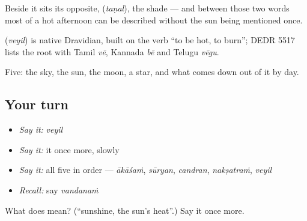 Beside it sits its opposite,  (\emph{taṇal}), the shade — and between those two words most of a hot afternoon can be described without the sun being mentioned once.

\begin{cousinweb}
\textbf{} (\emph{veyil}) is native Dravidian, built on the verb \textquotedblleft{}to be hot, to burn\textquotedblright{}; DEDR 5517 lists the root with Tamil \emph{vē}, Kannada \emph{bē} and Telugu \emph{vēgu}.
\end{cousinweb}

\begin{grammarlens}[title={What you've built}]
Five: the sky, the sun, the moon, a star, and what comes down out of it by day.
\end{grammarlens}

\subsection*{Your turn}
\begin{itemize}
\raggedright
  \item \emph{Say it:} \emph{veyil}
  \item \emph{Say it:} it once more, slowly
  \item \emph{Say it:} all five in order — \emph{ākāśaṁ}, \emph{sūryan}, \emph{candran}, \emph{nakṣatraṁ}, \emph{veyil}
  \item \emph{Recall:} say \emph{vandanaṁ}
\end{itemize}

\begin{tcolorbox}[breakable,colback=teal!4,colframe=teal!35!black,title={Before you move on}]
What does  mean? (\textquotedblleft{}sunshine, the sun's heat\textquotedblright{}.) Say it once more.
\end{tcolorbox}
